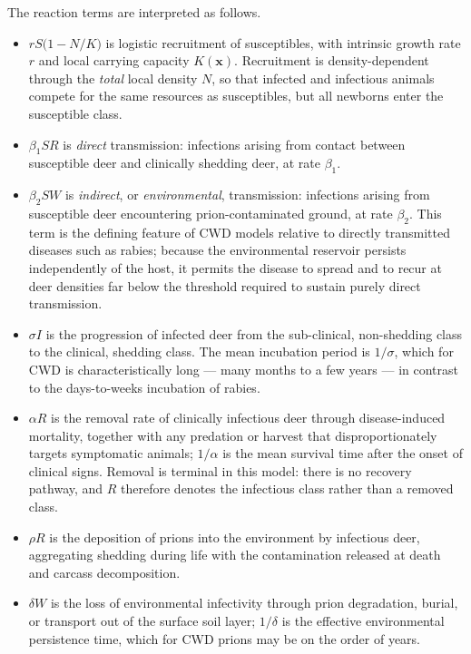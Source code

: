 \documentclass[11pt]{article}
\begin{document}
The reaction terms are interpreted as follows.
\begin{itemize}
  \item $rS\big(1-N/K\big)$ is logistic recruitment of susceptibles, with intrinsic growth rate $r$ and local carrying capacity $K(\mathbf{x})$. Recruitment is density-dependent through the \emph{total} local density $N$, so that infected and infectious animals compete for the same resources as susceptibles, but all newborns enter the susceptible class.
  \item $\beta_1 S R$ is \emph{direct} transmission: infections arising from contact between susceptible deer and clinically shedding deer, at rate $\beta_1$.
  \item $\beta_2 S W$ is \emph{indirect}, or \emph{environmental}, transmission: infections arising from susceptible deer encountering prion-contaminated ground, at rate $\beta_2$. This term is the defining feature of CWD models relative to directly transmitted diseases such as rabies; because the environmental reservoir persists independently of the host, it permits the disease to spread and to recur at deer densities far below the threshold required to sustain purely direct transmission.
  \item $\sigma I$ is the progression of infected deer from the sub-clinical, non-shedding class to the clinical, shedding class. The mean incubation period is $1/\sigma$, which for CWD is characteristically long --- many months to a few years --- in contrast to the days-to-weeks incubation of rabies.
  \item $\alpha R$ is the removal rate of clinically infectious deer through disease-induced mortality, together with any predation or harvest that disproportionately targets symptomatic animals; $1/\alpha$ is the mean survival time after the onset of clinical signs. Removal is terminal in this model: there is no recovery pathway, and $R$ therefore denotes the infectious class rather than a removed class.
  \item $\rho R$ is the deposition of prions into the environment by infectious deer, aggregating shedding during life with the contamination released at death and carcass decomposition.
  \item $\delta W$ is the loss of environmental infectivity through prion degradation, burial, or transport out of the surface soil layer; $1/\delta$ is the effective environmental persistence time, which for CWD prions may be on the order of years.
\end{itemize}
\end{document}
